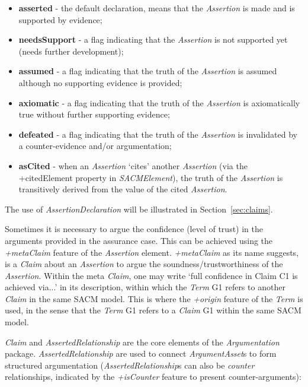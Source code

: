 \begin{itemize}
	\item \textbf{asserted} - the default declaration, means that the \textit{Assertion} is made and is supported by evidence;
	\item \textbf{needsSupport} - a flag indicating that the \textit{Assertion} is not supported yet (needs further development);
	\item \textbf{assumed} - a flag indicating that the truth of the \textit{Assertion} is assumed although no supporting evidence is provided;
	\item \textbf{axiomatic} - a flag indicating that the truth of the \textit{Assertion} is axiomatically true without further supporting evidence;
	\item \textbf{defeated} - a flag indicating that the truth of the \textit{Assertion} is invalidated by a counter-evidence and/or argumentation;
	\item \textbf{asCited} - when an \textit{Assertion} `cites' another \textit{Assertion} (via the +citedElement property in \textit{SACMElement}), the truth of the \textit{Assertion} is transitively derived from the value of the cited \textit{Assertion}.
\end{itemize}

The use of \textit{AssertionDeclaration} will be illustrated in Section~\ref{sec:claims}.

Sometimes it is necessary to argue the confidence (level of trust) in the arguments provided in the assurance case. 
This can be achieved using the \textit{+metaClaim} feature of the \textit{Assertion} element. 
\textit{+metaClaim} as its name suggests, is a \textit{Claim} about an \textit{Assertion} to argue the soundness/trustworthiness of the \textit{Assertion}. 
Within the meta \textit{Claim}, one may write `full confidence in Claim C1 is achieved via...' in its description, within which the \textit{Term} G1 refers to another \textit{Claim} in the same SACM model. 
This is where the \textit{+origin} feature of the \textit{Term} is used, in the sense that the \textit{Term} G1 refers to a \textit{Claim} G1 within the same SACM model.

\textit{Claim} and \textit{AssertedRelationship} are the core elements of the \textit{Argumentation} package.
\textit{AssertedRelationship} are used to connect \textit{ArgumentAsset}s to form structured argumentation (\textit{AssertedRelationship}s can also be \textit{counter} relationships, indicated by the \textit{+isCounter} feature to present counter-arguments):

